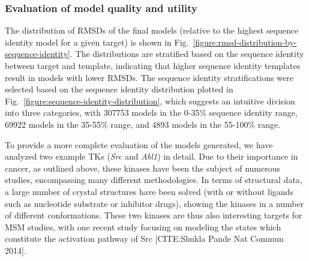 \documentclass[aps,pre,twocolumn,nofootinbib,superscriptaddress,linenumbers]{revtex4-1}
\begin{document}
\subsubsection*{Evaluation of model quality and utility}

The distribution of RMSDs of the final models (relative to the highest sequence identity model for a given target) is shown in Fig.~\ref{figure:rmsd-distribution-by-sequence-identity}.
The distributions are stratified based on the sequence identity between target and template, indicating that higher sequence identity templates result in models with lower RMSDs.
The sequence identity stratifications were selected based on the sequence identity distribution plotted in Fig.~\ref{figure:sequence-identity-distribution}, which suggests an intuitive division into three categories, with \num{307753} models in the 0-35\% sequence identity range, \num{69922} models in the 35-55\% range, and \num{4893} models in the 55-100\% range. 

To provide a more complete evaluation of the models generated, we have analyzed two example TKs (\emph{Src} and \emph{Abl1}) in detail.
Due to their importance in cancer, as outlined above, these kinases have been the subject of numerous studies, encompassing many different methodologies.
In terms of structural data, a large number of crystal structures have been solved (with or without ligands such as nucleotide substrate or inhibitor drugs), showing the kinases in a number of different conformations.
These two kinases are thus also interesting targets for MSM studies, with one recent study focusing on modeling the states which constitute the activation pathway of Src {\color{blue}[CITE:Shukla Pande Nat Commun 2014]}.
\end{document}
